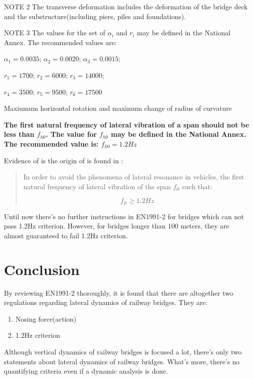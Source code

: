 \begin{appendices}
\begin{table}[h]
	NOTE 2 The transverse deformation includes the deformation of the bridge deck and the substructure(including piers, piles and foundations).
			
	NOTE 3 The values for the set of $\alpha_i$ and $r_i$ may be defined in the National Annex. The recommended values are:
			
	$ \alpha_1 = 0.0035$; $\alpha_2=0.0020$; $\alpha_3=0.0015$;
			
	$ r_1  =1700$; $r_2=6000$; $r_3=14000$;
			
	$ r_4 = 3500$; $r_5 = 9500$; $ r_6 = 17500$
	
	\caption{Maxiumum horizontal rotation and maximum change of radius of curvature}
	\label{tab:maximumhorizontalrotation}
\end{table}

\textbf{The first natural frequency of lateral vibration of a span should not be less than $f_{h0}$. The value for $f_{h0}$ may be defined in the National Annex. The recommended value is: $f_{h0}=1.2 Hz$}

Evidence of \citet{d181} is the origin of \citet[A.2.4.4.2.4(3)]{EC12} is found in \citet[p4.2: Lateral Frequencies]{d181}:

\begin{quote}
In order to avoid the phenomena of lateral resonance in vehicles, the first natural frequency of lateral vibration of the span $f_{lt}$ such that:

$$f_{lt} \geq 1.2Hz$$

\end{quote}

Until now there's no further instructions in EN1991-2 for bridges which can not pass 1.2Hz criterion. However, for bridges longer than 100 meters, they are almost guaranteed to fail 1.2Hz criterion.

\section{Conclusion}

By reviewing EN1991-2 thoroughly, it is found that there are altogether two regulations regarding lateral dynamics of railway bridges. They are:

\begin{enumerate}
	\item Nosing force(action)
	\item 1.2Hz criterion 
\end{enumerate}

Although vertical dynamics of railway bridges is focused a lot, there's only two statements about lateral dynamics of railway bridges. What's more, there's no quantifying criteria even if a dynamic analysis is done. 


\end{appendices}
